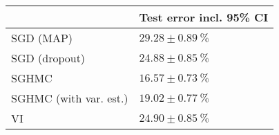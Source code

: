 \begin{tabular}{ll}
\toprule
{} & Test error incl. 95\% CI \\
\midrule
SGD (MAP)              &      $29.28 \pm 0.89~\%$ \\
SGD (dropout)          &      $24.88 \pm 0.85~\%$ \\
SGHMC                  &      $16.57 \pm 0.73~\%$ \\
SGHMC (with var. est.) &      $19.02 \pm 0.77~\%$ \\
VI                     &      $24.90 \pm 0.85~\%$ \\
\bottomrule
\end{tabular}
